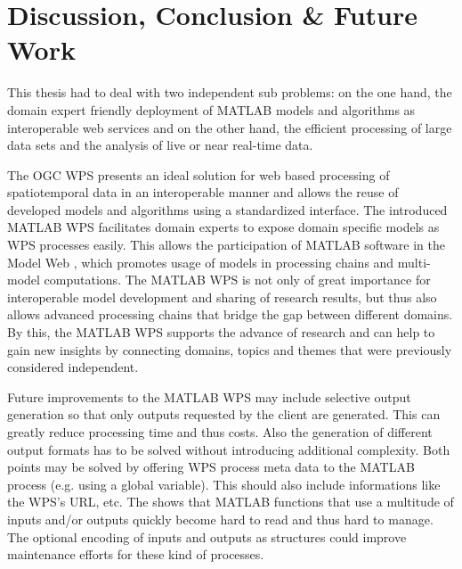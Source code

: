 
\chapter{Discussion, Conclusion \& Future Work}
\label{sec:conclusion}

This thesis had to deal with two independent sub problems: on the one hand, the domain expert friendly deployment of MATLAB models and algorithms as interoperable web services and on the other hand, the efficient processing of large data sets and the analysis of live or near real-time data.

The \ac{OGC} \acl{WPS} presents an ideal solution for web based processing of spatiotemporal data in an interoperable manner and allows the reuse of developed models and algorithms using a standardized interface. The introduced MATLAB WPS facilitates domain experts to expose domain specific models as WPS processes easily. This allows the participation of MATLAB software in the Model Web \citep{geller2008looking}, which promotes usage of models in processing chains and multi-model computations. The MATLAB WPS is not only of great importance for interoperable model development and sharing of research results, but thus also allows advanced processing chains that bridge the gap between different domains. By this, the MATLAB WPS supports the advance of research and can help to gain new insights by connecting domains, topics and themes that were previously considered independent.

Future improvements to the MATLAB WPS may include selective output generation so that only outputs requested by the client are generated. This can greatly reduce processing time and thus costs. Also the generation of different output formats has to be solved without introducing additional complexity. Both points may be solved by offering WPS process meta data to the MATLAB process (e.g. using a global variable). This should also include informations like the WPS's URL, etc. The \la shows that MATLAB functions that use a multitude of inputs and/or outputs quickly become hard to read and thus hard to manage. The optional encoding of inputs and outputs as structures could improve maintenance efforts for these kind of processes.

